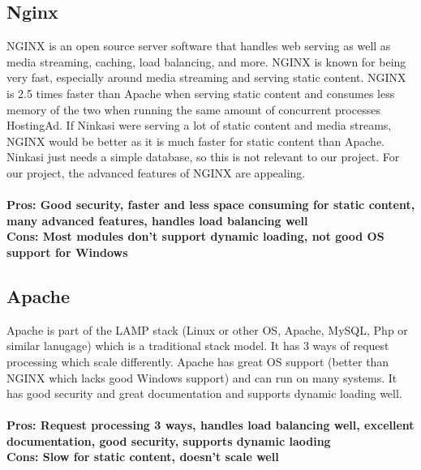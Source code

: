 \documentclass[draftclsnofoot,onecolumn,letterpaper,10pt,compsoc]{IEEEtran}
\begin{document}
	\subsection{Nginx}
		NGINX is an open source server software that handles web serving as well as media streaming, caching, load balancing, and more\cite{NGINX}.
		NGINX is known for being very fast, especially around media streaming and serving static content\cite{NGINX}.
		NGINX is 2.5 times faster than Apache when serving static content and consumes less memory of the two when running the same amount of concurrent processes HostingAd.
		If Ninkasi were serving a lot of static content and media streams, NGINX would be better as it is much faster for static content than Apache.
		Ninkasi just needs a simple database, so this is not relevant to our project.
		For our project, the advanced features of NGINX are appealing.
		\\ \\
		\textbf{Pros: Good security, faster and less space consuming for static content, many advanced features, handles load balancing well}
		\\
		\textbf{Cons: Most modules don't support dynamic loading, not good OS support for Windows}

	\subsection{Apache}
		Apache is part of the LAMP stack (Linux or other OS, Apache, MySQL, Php or similar lanugage) which is a traditional stack model\cite{UpWork}.
		It has 3 ways of request processing which scale differently.
		Apache has great OS support (better than NGINX which lacks good Windows support) and can run on many systems\cite{HostingAd}.
		It has good security and great documentation and supports dynamic loading well\cite{HostingAd}.
		\\ \\
		\textbf{Pros: Request processing 3 ways, handles load balancing well, excellent documentation, good security, supports dynamic laoding}
		\\
		\textbf{Cons: Slow for static content, doesn't scale well}
\end{document}
